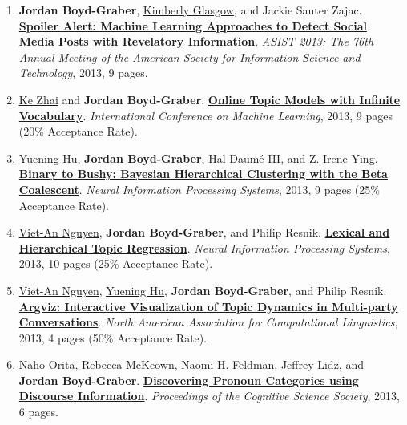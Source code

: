 {\begin{enumerate}
	 \item {\bf Jordan Boyd-Graber}, \underline{Kimberly Glasgow}, and Jackie Sauter Zajac.  {\bf \href{http://cs.umd.edu/~jbg//docs/2013_spoiler.pdf}{Spoiler Alert: Machine Learning Approaches to Detect Social Media Posts with Revelatory Information}}.  \emph{ASIST 2013: The 76th Annual Meeting of the American Society for Information Science and Technology}, 2013, 9 pages.

	 \item \underline{\href{https://kzhai.github.io/}{Ke Zhai}} and {\bf Jordan Boyd-Graber}.  {\bf \href{http://cs.umd.edu/~jbg//docs/2013_icml_infvoc.pdf}{Online Topic Models with Infinite Vocabulary}}.  \emph{International Conference on Machine Learning}, 2013, 9 pages (20\% Acceptance Rate).

	 \item \underline{\href{https://scholar.google.com/citations?user=mO_62fQAAAAJ&hl=en}{Yuening Hu}}, {\bf Jordan Boyd-Graber}, Hal {Daum\'{e} III}, and Z. Irene Ying.  {\bf \href{http://cs.umd.edu/~jbg//docs/2013_coalescent.pdf}{Binary to Bushy: Bayesian Hierarchical Clustering with the Beta Coalescent}}.  \emph{Neural Information Processing Systems}, 2013, 9 pages (25\% Acceptance Rate).

	 \item \underline{\href{https://viet-an.github.io/}{Viet-An Nguyen}}, {\bf Jordan Boyd-Graber}, and Philip Resnik.  {\bf \href{http://cs.umd.edu/~jbg//docs/2013_shlda.pdf}{Lexical and Hierarchical Topic Regression}}.  \emph{Neural Information Processing Systems}, 2013, 10 pages (25\% Acceptance Rate).

	 \item \underline{\href{https://viet-an.github.io/}{Viet-An Nguyen}}, \underline{\href{https://scholar.google.com/citations?user=mO_62fQAAAAJ&hl=en}{Yuening Hu}}, {\bf Jordan Boyd-Graber}, and Philip Resnik.  {\bf \href{http://cs.umd.edu/~jbg//docs/2013_argviz.pdf}{Argviz: Interactive Visualization of Topic Dynamics in Multi-party Conversations}}.  \emph{North American Association for Computational Linguistics}, 2013, 4 pages (50\% Acceptance Rate).

	 \item Naho Orita, Rebecca McKeown, Naomi H. Feldman, Jeffrey Lidz, and {\bf Jordan Boyd-Graber}.  {\bf \href{http://cs.umd.edu/~jbg//docs/2013_cogsci_pronoun.pdf}{Discovering Pronoun Categories using Discourse Information}}.  \emph{Proceedings of the Cognitive Science Society}, 2013, 6 pages.


\end{enumerate}}
